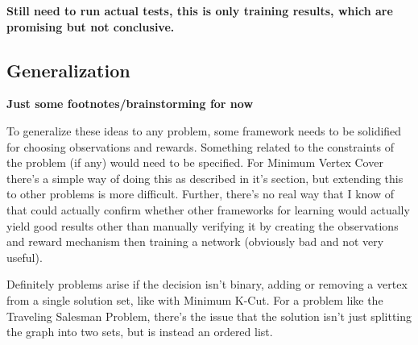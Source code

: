 \documentclass{article}
\begin{document}
\textbf{Still need to run actual tests, this is only training results, which are promising but not conclusive.}

\subsection{Generalization}

\textbf{Just some footnotes/brainstorming for now}

To generalize these ideas to any problem, some framework needs to be solidified for choosing observations and rewards. Something related to the constraints of the problem (if any) would need to be specified. For Minimum Vertex Cover there's a simple way of doing this as described in it's section, but extending this to other problems is more difficult. Further, there's no real way that I know of that could actually confirm whether other frameworks for learning would actually yield good results other than manually verifying it by creating the observations and reward mechanism then training a network (obviously bad and not very useful).

Definitely problems arise if the decision isn't binary, adding or removing a vertex from a single solution set, like with Minimum K-Cut. For a problem like the Traveling Salesman Problem, there's the issue that the solution isn't just splitting the graph into two sets, but is instead an ordered list. 



\end{document}
